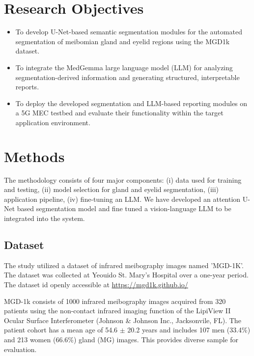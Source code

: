 \documentclass{article}
\begin{document}
\section{Research Objectives}
\begin{itemize}
    \item To develop U-Net-based semantic segmentation modules for the automated segmentation of meibomian gland and eyelid regions using the MGD1k dataset.
    \item To integrate the MedGemma large language model (LLM) for analyzing segmentation-derived information and generating structured, interpretable reports.
    \item To deploy the developed segmentation and LLM-based reporting modules on a 5G MEC testbed and evaluate their functionality within the target application environment.
\end{itemize}


 \section{Methods}
The methodology consists of four major components: (i) data used for training and testing, (ii) model selection for gland and eyelid segmentation, (iii) application pipeline, (iv) fine-tuning an LLM. We have developed an attention U-Net based segmentation model and fine tuned a vision-language  LLM\cite{vaswani2017attention} to be integrated into the system.


\subsection{Dataset}

The study utilized a dataset of infrared meibography images named 'MGD-1K'\cite{saha2022automated}. The dataset was collected at Yeouido St. Mary's Hospital over a one-year period. The dataset id openly accessible at \url{https://mgd1k.github.io/}

MGD-1k consists of 1000 infrared meibography images acquired from 320 patients using the non-contact infrared imaging function of the LipiView II Ocular Surface Interferometer (Johnson \& Johnson Inc., Jacksonvile, FL). The patient cohort has a mean age of 54.6 $\pm$ 20.2 years and includes 107 men (33.4\%) and 213 women (66.6\%) gland (MG) images. This provides diverse sample for evaluation.
\end{document}
